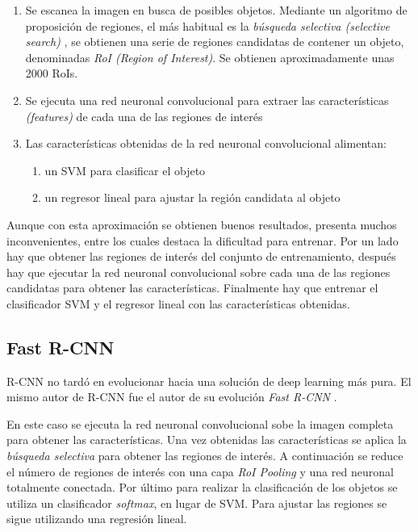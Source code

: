 \begin{enumerate}
	\item Se escanea la imagen en busca de posibles objetos. Mediante un algoritmo de proposición de regiones, el más habitual es la \textit{búsqueda selectiva (selective search)} \cite{s2_stateofart_selectivesearch}, se obtienen una serie de regiones candidatas de contener un objeto, denominadas \textit{RoI (Region of Interest)}. Se obtienen aproximadamente unas 2000 RoIs.
	\item Se ejecuta una red neuronal convolucional para extraer las características \textit{(features)} de cada una de las regiones de interés
	\item Las características obtenidas de la red neuronal convolucional alimentan:
	\begin{enumerate}
		\item un SVM para clasificar el objeto
		\item un regresor lineal para ajustar la región candidata al objeto
	\end{enumerate}
\end{enumerate}

Aunque con esta aproximación se obtienen buenos resultados, presenta muchos inconvenientes, entre los cuales destaca la dificultad para entrenar. Por un lado hay que obtener las regiones de interés del conjunto de entrenamiento, después hay que ejecutar la red neuronal convolucional sobre cada una de las regiones candidatas para obtener las características. Finalmente hay que entrenar el clasificador SVM y el regresor lineal con las características obtenidas.

\subsection*{Fast R-CNN}

R-CNN no tardó en evolucionar hacia una solución de deep learning más pura. El mismo autor de R-CNN fue el autor de su evolución \textit{Fast R-CNN} \cite{s2_stateofart_fastrcnn}.

En este caso se ejecuta la red neuronal convolucional sobe la imagen completa para obtener las características. Una vez obtenidas las características se aplica la \textit{búsqueda selectiva} para obtener las regiones de interés. A continuación se reduce el número de regiones de interés con una capa \textit{RoI Pooling} y una red neuronal totalmente conectada. Por último para realizar la clasificación de los objetos se utiliza un clasificador \textit{softmax}, en lugar de SVM. Para ajustar las regiones se sigue utilizando una regresión lineal.

